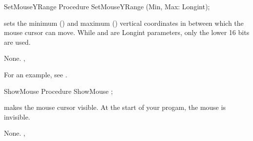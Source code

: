 \latex{}
\html{}
\begin{procedure}{SetMouseYRange}
\Declaration
Procedure SetMouseYRange (Min, Max: Longint);

\Description

sets the minimum () and maximum () vertical coordinates in between which the
mouse cursor can move.
While  and  are Longint parameters, only the lower 16 bits 
are used.

\Errors
None.
\SeeAlso
{}, 
\end{procedure}
For an example, see .
\begin{procedure}{ShowMouse}
\Declaration
Procedure ShowMouse ;

\Description

 makes the mouse cursor visible.
At the start of your progam, the mouse is invisible.

\Errors
None.
\SeeAlso
{},
\end{procedure}
\latex{}
\html{}

